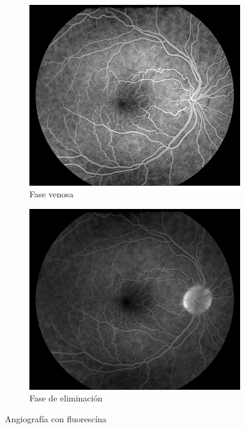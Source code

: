 \begin{figure}[H]
\begin{subfigure}[b]{0.45\textwidth}
        \label{fig:af2}
    \end{subfigure}
	\begin{subfigure}[b]{0.45\textwidth}
        \includegraphics[width=1\textwidth]{./Figures/FA_Fig3.jpg}
        \caption{Fase venosa}
        \label{fig:af3}
    \end{subfigure}
    	\begin{subfigure}[b]{0.45\textwidth}
        \includegraphics[width=1\textwidth]{./Figures/FA_Fig4.jpg}
        \caption{Fase de eliminación}
        \label{fig:af4}
    \end{subfigure}
	\label{fig:retina}
	\caption{Angiograf\'ia con fluoresc\'ina}
\end{figure}



